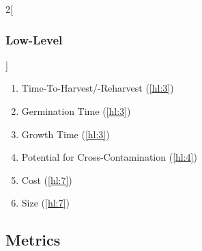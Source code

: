 \documentclass{report}
\begin{document}
\begin{multicols}{2}[\subsubsection{Low-Level}\label{sec:llos}]
\begin{enumerate}[label=LL\arabic*., ref=LL\arabic*]
        \item \label{ll:22} Time-To-Harvest/-Reharvest \hfill (\ref{hl:3})
        \item \label{ll:23} Germination Time \hfill (\ref{hl:3})
        \item \label{ll:24} Growth Time \hfill (\ref{hl:3})
        \item \label{ll:25} Potential for Cross-Contamination \hfill (\ref{hl:4})
        \item \label{ll:37} Cost \hfill (\ref{hl:7})
        \item \label{ll:38} Size \hfill (\ref{hl:7})
    \end{enumerate}
\end{multicols}

\newpage

\subsection{Metrics}
\label{sec:metrics}
\end{document}
